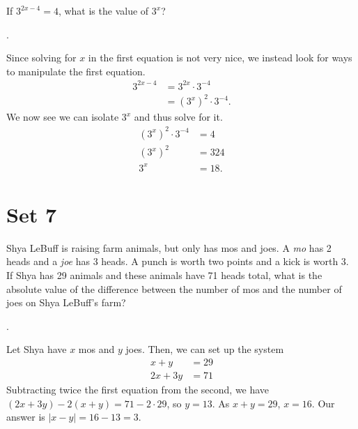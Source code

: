 \documentclass[11pt]{article}
\begin{document}
\begin{problem}If $3^{2x-4} = 4$, what is the value of $3^{x}$?
\end{problem}
\begin{answer}
.
\end{answer}
\begin{solution}
Since solving for $x$ in the first equation is not very nice, we instead look for ways to manipulate the first equation.
\begin{align*}
3^{2x-4} &= 3^{2x} \cdot 3^{-4} \\
&= (3^x)^2 \cdot 3^{-4}.
\end{align*}
We now see we can isolate  $3^{x}$ and thus solve for it.
\begin{align*}
(3^x)^2 \cdot 3^{-4} &= 4 \\
(3^x)^2 &= 324 \\
3^x &= \boxed{18}.
\end{align*}
\end{solution}

\eject

\pdfpageheight=11in

\section*{Set 7}

\begin{problem}  Shya LeBuff is raising farm animals, but only has mos and joes. A \emph{mo} has 2 heads and a \emph{joe} has 3 heads. A punch is worth two points and a kick is worth 3. If Shya has 29 animals and these animals have 71 heads total, what is the absolute value of the difference between the number of mos and the number of joes on Shya LeBuff's farm?
\end{problem}

\begin{answer} . \end{answer}
\begin{solution}
Let Shya have $x$ mos and $y$ joes. Then, we can set up the system
\begin{align*}
x + y &= 29 \\
2x + 3y &= 71
\end{align*}
Subtracting twice the first equation from the second, we have $(2x + 3y) - 2(x + y) = 71 - 2 \cdot 29$, so $y = 13$. As $x + y = 29$, $x = 16$. Our answer is $\left| x - y \right| = 16 - 13 = \boxed{3}$.
\end{solution}
\end{document}
